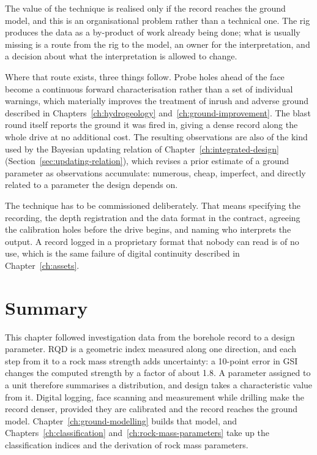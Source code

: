 The value of the technique is realised only if the record reaches the ground
model, and this is an organisational problem rather than a technical one. The
rig produces the data as a by-product of work already being done; what is
usually missing is a route from the rig to the model, an owner for the
interpretation, and a decision about what the interpretation is allowed to
change.

Where that route exists, three things follow. Probe holes ahead of the face
become a continuous forward characterisation rather than a set of individual
warnings, which materially improves the treatment of inrush and adverse ground
described in Chapters~\ref{ch:hydrogeology} and~\ref{ch:ground-improvement}.
The blast round itself reports the ground it was fired in, giving a dense
record along the whole drive at no additional cost. The resulting
observations are also of the kind used by the Bayesian updating relation
of Chapter~\ref{ch:integrated-design} (Section~\ref{sec:updating-relation}),
which revises a prior estimate of a ground parameter as observations
accumulate: numerous, cheap, imperfect, and directly related to a parameter
the design depends on.

The technique has to be commissioned deliberately. That
means specifying the recording, the depth registration and the data format in
the contract, agreeing the calibration holes before the drive begins, and
naming who interprets the output. A record logged in a proprietary format
that nobody can read is of no use, which is the same failure of digital
continuity described in Chapter~\ref{ch:assets}.

\section{Summary}
\label{sec:site-investigation-summary}

This chapter followed investigation data from the borehole record to a design
parameter. RQD is a geometric index measured along one direction, and each
step from it to a rock mass strength adds uncertainty: a 10-point error in GSI
changes the computed strength by a factor of about 1.8. A parameter assigned
to a unit therefore summarises a distribution, and design takes a
characteristic value from it. Digital logging, face scanning and measurement
while drilling make the record denser, provided they are calibrated and the
record reaches the ground model. Chapter~\ref{ch:ground-modelling} builds that
model, and Chapters~\ref{ch:classification} and~\ref{ch:rock-mass-parameters}
take up the classification indices and the derivation of rock mass parameters.

\chapterreferences
